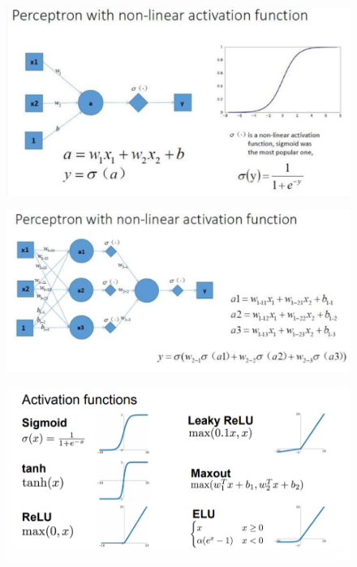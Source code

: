 \documentclass[11pt]{article}
\makeatletter
\def\maxwidth{\ifdim\Gin@nat@width>\linewidth\linewidth
    \else\Gin@nat@width\fi}
\let\Oldincludegraphics\includegraphics
\renewcommand{\includegraphics}[1]{\Oldincludegraphics[width=.8\maxwidth]{#1}}
\makeatother
\begin{document}
    \begin{figure}
\centering
\includegraphics{node.png}
\caption{}
\end{figure}

    \begin{figure}
\centering
\includegraphics{multi-node.png}
\caption{}
\end{figure}

    \begin{figure}
\centering
\includegraphics{active_function.png}
\caption{}
\end{figure}
\end{document}
